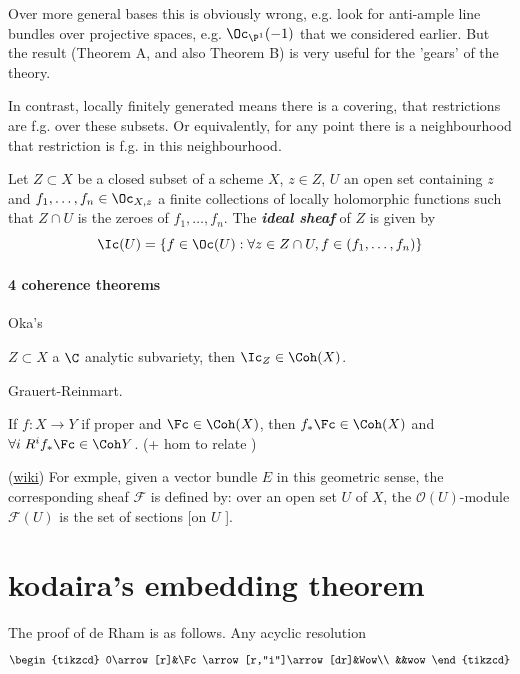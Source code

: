 Over more general bases this is obviously wrong, e.g. look for anti-ample line bundles over projective spaces, e.g. $\Oc_{\P^1}(-1)$ that we considered earlier. But the result (Theorem A, and also Theorem B) is very useful for the 'gears' of the theory.

In contrast, locally finitely generated means there is a covering, that restrictions are f.g. over these subsets. Or equivalently, for any point there is a neighbourhood that restriction is f.g. in this neighbourhood.

\begin{defn}
	Let $Z\subset X$ be a closed subset of a scheme $X$, $z\in Z$, $U$ an open set containing $z$ and $f_1,\ldots,f_n\in\Oc_{X,z}$ a finite collections of locally holomorphic functions such that $Z\cap U$ is the zeroes of $f_1,\ldots,f_n$. The \textbf{\textit{ideal sheaf}} of $Z$ is given by
	\[\Ic(U)=\{f\in\Oc(U):\forall z\in Z\cap U, f\in(f_1,\ldots,f_n)\}\]
\end{defn}
\paragraph{4 coherence theorems}
\begin{thm}
	Oka's
\end{thm}
\begin{thm}
	$Z\subset X$ a $\C$ analytic subvariety, then $\Ic_Z\in \Coh(X)$.
\end{thm}
\begin{thm}
	Grauert-Reinmart.
\end{thm}
\begin{thm}
	If $f:X\to Y$ if proper and $\Fc\in\Coh(X)$, then $f_*\Fc\in\Coh(X)$ and $\forall i \;R^i f_*\Fc\in\Coh Y$. (+ hom to relate )
\end{thm}

\begin{remark}
	(\href{https://en.wikipedia.org/wiki/Coherent_sheaf#Basic_constructions_of_coherent_sheaves}{wiki}) For exmple, given a vector bundle $E$ in this geometric sense, the corresponding sheaf $\mathcal{F}$ is defined by: over an open set $U$ of $X$, the $\mathcal{O}(U)$-module $\mathcal{F}(U)$ is the set of sections [on  $U$ ].
\end{remark}

\section{kodaira's embedding theorem}
The proof of de Rham is as follows.
Any acyclic resolution
\[\begin{tikzcd}
	0\arrow[r]&\Fc\arrow[r,"i"]\arrow[dr]&Wow\\
	&&wow
\end{tikzcd}\]

